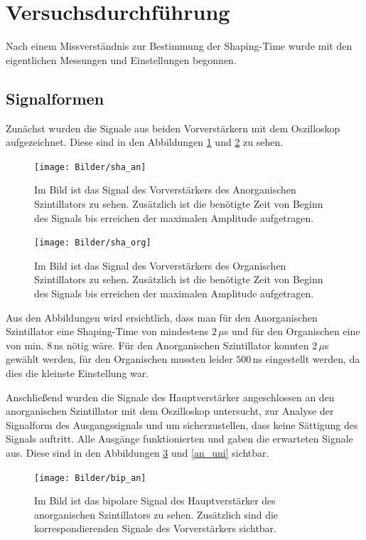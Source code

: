 \section{Versuchsdurchführung}
Nach einem Missverständnis zur Bestimmung der Shaping-Time wurde mit den eigentlichen Messungen und Einstellungen begonnen.
\subsection{Signalformen}
Zunächst wurden die Signale aus beiden Vorverstärkern mit dem Oszilloskop aufgezeichnet. Diese sind in den Abbildungen \ref{vv_anorg} und \ref{vv_org}  zu sehen. 

\begin{figure}[h]
	\centering
	\texttt{[image: Bilder/sha\_an]}
	\caption[Signal des NaJ Preamp.]{\small Im Bild ist das Signal des Vorverstärkers des Anorganischen Szintillators zu sehen. Zusätzlich ist die benötigte Zeit von Beginn des Signals bis erreichen der maximalen Amplitude aufgetragen.}
	\label{vv_anorg}
\end{figure} 

\begin{figure}[h]
		\centering
	\texttt{[image: Bilder/sha\_org]}
	\caption[Signal des Organischen Preamp.]{\small Im Bild ist das Signal des Vorverstärkers des Organischen Szintillators zu sehen. Zusätzlich ist die benötigte Zeit von Beginn des Signals bis erreichen der maximalen Amplitude aufgetragen.}
	\label{vv_org}
\end{figure}

Aus den Abbildungen wird ersichtlich, dass man für den Anorganischen Szintillator eine Shaping-Time von mindestens $2\,\mu$s und für den Organischen eine von min. $8\,$ns nötig wäre. Für den Anorganischen Szintillator konnten $2\,\mu$s gewählt werden, für den Organischen mussten leider $500\,$ns eingestellt werden, da dies die kleinste Einstellung war.\par
Anschließend wurden die Signale des Hauptverstärker angeschlossen an den anorganischen Szintillator mit dem Oszilloskop untersucht, zur Analyse der Signalform des Ausgangssignals und um sicherzustellen, dass keine Sättigung des Signals auftritt. Alle Ausgänge funktionierten und gaben die erwarteten Signale aus. Diese sind in den Abbildungen \ref{an_bi} und \ref{an_uni} sichtbar.

\begin{figure}[h]
	\centering
	\texttt{[image: Bilder/bip\_an]}
	\caption[Bipolares Signal des Anorganischen Amp.]{\small Im Bild ist das bipolare Signal des Hauptverstärker des anorganischen Szintillators zu sehen. Zusätzlich sind die korrespondierenden Signale des Vorverstärkers sichtbar.}
	\label{an_bi}
\end{figure}

